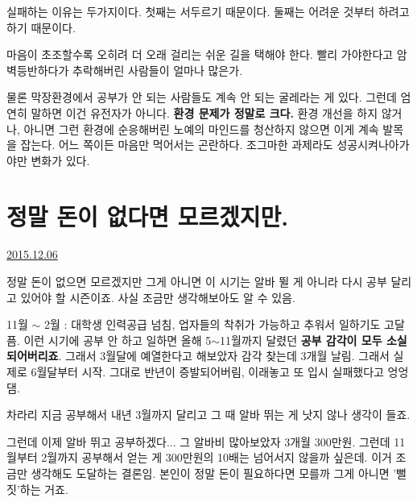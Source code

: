 실패하는 이유는 두가지이다.
첫째는 서두르기 때문이다.
둘째는 어려운 것부터 하려고 하기 때문이다.
\vspace{5mm}

마음이 초조할수록 오히려 더 오래 걸리는 쉬운 길을 택해야 한다.
빨리 가야한다고 암벽등반하다가 추락해버린 사람들이 얼마나 많은가.
\vspace{5mm}

물론 막장환경에서 공부가 안 되는 사람들도 계속 안 되는 굴레라는 게 있다.
그런데 엄연히 말하면 이건 유전자가 아니다. \textbf{환경 문제가 정말로 크다.}
환경 개선을 하지 않거나, 아니면 그런 환경에 순응해버린 노예의 마인드를 청산하지 않으면 이게 계속 발목을 잡는다.
어느 쪽이든 마음만 먹어서는 곤란하다. 조그마한 과제라도 성공시켜나아가야만 변화가 있다.
\vspace{5mm}





\section{정말 돈이 없다면 모르겠지만.}
\href{https://www.kockoc.com/Apoc/530358}{2015.12.06}

\vspace{5mm}

정말 돈이 없으면 모르겠지만 그게 아니면 이 시기는 알바 뛸 게 아니라 다시 공부 달리고 있어야 할 시즌이죠.
사실 조금만 생각해보아도 알 수 있음.
\vspace{5mm}

11월 $\sim$ 2월 : 대학생 인력공급 넘침, 업자들의 착취가 가능하고 추워서 일하기도 고달픔.
이런 시기에 공부 안 하고 일하면 올해 5$\sim$11월까지 달렸던 \textbf{공부 감각이 모두 소실되어버리죠}.
그래서 3월달에 예열한다고 해보았자 감각 찾는데 3개월 날림.
그래서 실제로 6월달부터 시작. 그대로 반년이 증발되어버림, 이래놓고 또 입시 실패했다고 엉엉댐.
\vspace{5mm}

차라리 지금 공부해서 내년 3월까지 달리고 그 때 알바 뛰는 게 낫지 않나 생각이 들죠.
\vspace{5mm}

그런데 이제 알바 뛰고 공부하겠다... 그 알바비 많아보았자 3개월 300만원.
그런데 11월부터 2월까지 공부해서 얻는 게 300만원의 10배는 넘어서지 않을까 싶은데.
이거 조금만 생각해도 도달하는 결론임. 본인이 정말 돈이 필요하다면 모를까 그게 아니면 '뻘짓'하는 거죠.
\vspace{5mm}





